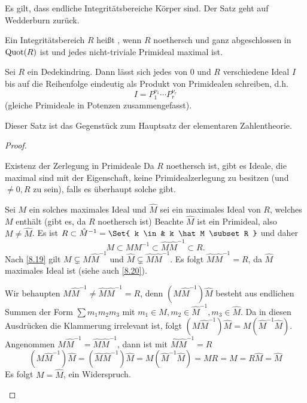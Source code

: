 \begin{nt*}
	Es gilt, dass endliche Integritätsbereiche Körper sind.
	Der Satz geht auf Wedderburn zurück. %
\end{nt*}

\begin{df} \label{8.16}
	Ein Integritätsbereich $R$ heißt , wenn $R$ noethersch und ganz abgeschlossen in $\operatorname{Quot}(R)$ ist und jedes nicht-triviale Primideal maximal ist.
\end{df}

\begin{st} \label{8.17}
	Sei $R$ ein Dedekindring.
	Dann lässt sich jedes von $0$ und $R$ verschiedene Ideal $I$ bis auf die Reihenfolge eindeutig als Produkt von Primidealen schreiben, d.h.
	\[
		I = P_1^{\nu_1} \dotsb P_r^{\nu_r}
	\]
	(gleiche Primideale in Potenzen zusammengefasst).
	\begin{note}
		Dieser Satz ist das Gegenstück zum Hauptsatz der elementaren Zahlentheorie.
	\end{note}
	\begin{proof}
		\begin{seg}{Existenz der Zerlegung in Primideale}
			Da $R$ noethersch ist, gibt es Ideale, die maximal sind mit der Eigenschaft, keine Primidealzerlegung zu besitzen (und $\neq 0, R$ zu sein), falls es überhaupt solche gibt.

			Sei $M$ ein solches maximales Ideal und $\hat M$ sei ein maximales Ideal von $R$, welches $M$ enthält (gibt es, da $R$ noethersch ist)
			Beachte $\hat M$ ist ein Primideal, also $M \neq \hat M$.
			Es ist $R \subset \hat M^{-1} = \Set{ k \in  & k \hat M \subset R }$ und daher
			\[
				M \subset M M^{-1} \subset \hat M \hat M^{-1} \subset R.
			\]
			Nach \ref{8.19} gilt $M \subsetneq M \hat M^{-1}$ und $\hat M \subsetneq \hat M \hat M^{-1}$.
			Es folgt $\hat M \hat M^{-1} = R$, da $\hat M$ maximales Ideal ist (siehe auch \ref{8.20}).

			Wir behaupten $M \hat M^{-1} \neq \hat M \hat M^{-1} = R$, denn
			$(M \hat M^{-1}) \hat M$ besteht aus endlichen Summen der Form $\sum m_1 m_2 m_3$ mit $m_1 \in M, m_2 \in \hat M^{-1}, m_3 \in \hat M$.
			Da in diesen Ausdrücken die Klammerung irrelevant ist, folgt $(M \hat M^{-1}) \hat M = M (\hat M^{-1} \hat M)$.
			Angenommen $M \hat M^{-1} = \hat M \hat M^{-1}$, dann ist mit $\hat M \hat M^{-1} = R$
			\[
				(M \hat M^{-1}) \hat M
				= (\hat M \hat M^{-1}) \hat M
				= M (\hat M^{-1} \hat M)
				= M R
				= M
				= R \hat M
				= \hat M
			\]
			Es folgt $M = \hat M$, ein Widerspruch.


\end{seg}
\end{proof}
\end{st}
